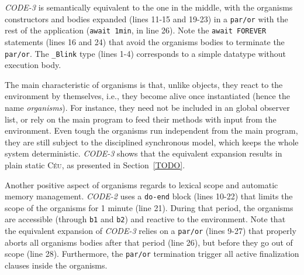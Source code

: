 \documentclass{acm_proc_article-sp}
\newcommand{\CEU}{\textsc{C\'{e}u}\xspace}
\newcommand{\code}[1] {{\small{\texttt{#1}}}}
\newcommand{\1}{\;}
\newcommand{\2}{\;\;}
\newcommand{\3}{\;\;\;}
\newcommand{\5}{\;\;\;\;\;}
\begin{document}
\emph{CODE-3} is semantically equivalent to the one in the middle, with the 
organisms constructors and bodies expanded (lines 11-15 and 19-23) in a 
\code{par/or} with the rest of the application (\code{await 1min}, in line 26).  
Note the \code{await FOREVER} statements (lines 16 and 24) that avoid the 
organisms bodies to terminate the \code{par/or}.
The \code{\_Blink} type (lines 1-4) corresponds to a simple datatype without 
execution body.

The main characteristic of organisms is that, unlike objects, they react to the 
environment by themselves, i.e., they become alive once instantiated (hence the 
name \emph{organisms}).
%
For instance, they need not be included in an global observer list, or rely on 
the main program to feed their methods with input from the environment.
%
Even tough the organisms run independent from the main program, they are still 
subject to the disciplined synchronous model, which keeps the whole system 
deterministic.
%
\emph{CODE-3} shows that the equivalent expansion results in plain static \CEU, 
as presented in Section~\ref{TODO}.

Another positive aspect of organisms regards to lexical scope and automatic 
memory management.
%
\emph{CODE-2} uses a \code{do-end} block (lines 10-22) that limits the scope of 
the organisms for 1 minute (line 21).
%
During that period, the organisms are accessible (through \code{b1} and 
\code{b2}) and reactive to the environment.
%
Note that the equivalent expansion of \emph{CODE-3} relies on a \code{par/or} 
(lines 9-27) that properly aborts all organisms bodies after that period (line 
26), but before they go out of scope (line 28).
%
Furthermore, the \code{par/or} termination trigger all active finalization 
clauses inside the organisms.
\end{document}
